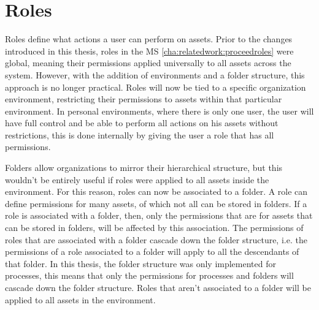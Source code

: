\section{Roles}
\label{cha:conceptanddesign:roles}

Roles define what actions a user can perform on assets.
Prior to the changes introduced in this thesis,
roles in the MS \ref{cha:relatedwork:proceedroles} were global,
meaning their permissions applied universally to all assets across the system.
However, with the addition of environments and a folder structure, this approach is no
longer practical.
Roles will now be tied to a specific organization environment,
restricting their permissions to assets within that particular environment.
In personal environments, where there is only one user, the user will have
full control and be able to perform all actions on his assets without restrictions,
this is done internally by giving the user a role that has all permissions.

Folders allow organizations to mirror their hierarchical structure, but this wouldn't be
entirely useful if roles were applied to all assets inside the environment.
For this reason, roles can now be associated to a folder.
%
A role can define permissions for many assets, of which not all can be stored in folders.
If a role is associated with a folder, then, only the permissions that are for assets that
can be stored in folders, will be affected by this association.
%
The permissions of roles that are associated with a folder cascade down the
folder structure, i.e. the permissions of a role associated to a folder will 
apply to all the descendants of that folder.
In this thesis, the folder structure was only implemented for processes,
this means that only the permissions for processes and folders will 
cascade down the folder structure.
Roles that aren't associated to a folder will be applied to all assets in the environment.

